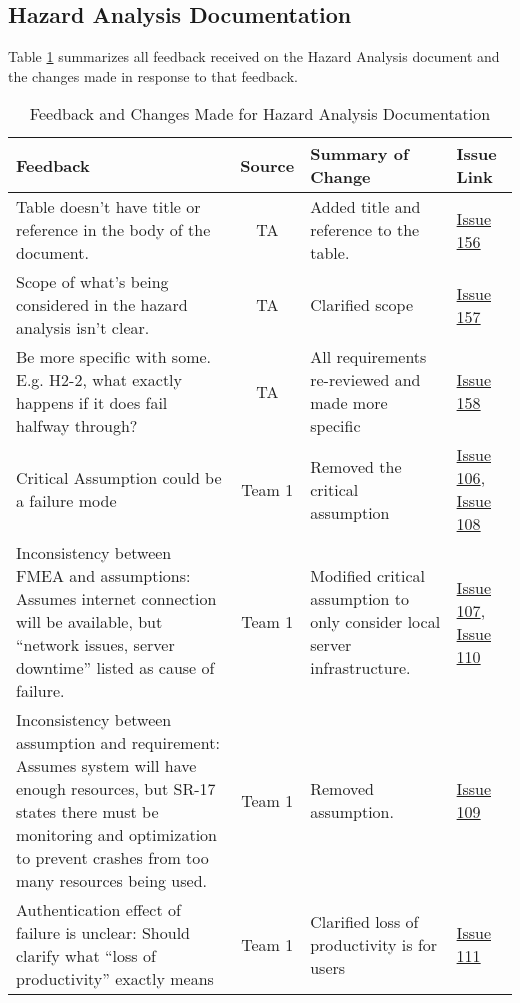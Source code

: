 \documentclass{article}
\begin{document}
\subsection{Hazard Analysis Documentation}
Table \ref{table:HA} summarizes all feedback received on the Hazard Analysis
document and the changes made in response to that feedback.
\begin{table}[H]
\centering
\begin{tabularx}{\textwidth}{|X|c|X|p{1.5cm}|}
    \hline
    \textbf{Feedback} & \textbf{Source} & \textbf{Summary of Change} &
    \textbf{Issue Link} \\
    \hline
    Table doesn't have title or reference in the body of the document. & TA &
    Added title and reference to the table. &
    \href{https://github.com/SumanyaG/Alkalytics/issues/156}{Issue 156} \\
    \hline
    Scope of what's being considered in the hazard analysis isn't clear. & TA &
    Clarified scope &
    \href{https://github.com/SumanyaG/Alkalytics/issues/157}{Issue 157} \\
    \hline
    Be more specific with some. E.g. H2-2, what exactly happens if it does fail
    halfway through? & TA & All requirements re-reviewed and made more specific
    & \href{https://github.com/SumanyaG/Alkalytics/issues/158}{Issue 158} \\
    \hline
    Critical Assumption could be a failure mode & Team 1 & Removed the critical
    assumption & \href{https://github.com/SumanyaG/Alkalytics/issues/106}{Issue
    106}, \newline
    \href{https://github.com/SumanyaG/Alkalytics/issues/108}{Issue 108} \\
    \hline
    Inconsistency between FMEA and assumptions: Assumes internet connection will
    be available, but ``network issues, server downtime'' listed as cause of
    failure. & Team 1 & Modified critical assumption to only consider local
    server infrastructure. &
    \href{https://github.com/SumanyaG/Alkalytics/issues/107}{Issue 107},
    \newline
    \href{https://github.com/SumanyaG/Alkalytics/issues/110}{Issue 110} \\
    \hline
    Inconsistency between assumption and requirement: Assumes system will have
    enough resources, but SR-17 states there must be monitoring and optimization
    to prevent crashes from too many resources being used. & Team 1 & Removed
    assumption. & \href{https://github.com/SumanyaG/Alkalytics/issues/109}{Issue
    109} \\
    \hline
    Authentication effect of failure is unclear: Should clarify what ``loss of
    productivity'' exactly means & Team 1 & Clarified loss of productivity is
    for users & \href{https://github.com/SumanyaG/Alkalytics/issues/111}{Issue
    111} \\
    \hline
\end{tabularx}
\caption{Feedback and Changes Made for Hazard Analysis Documentation}
\label{table:HA}
\end{table}
\end{document}
